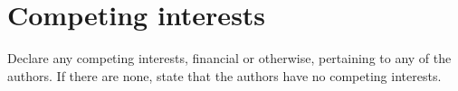 \documentclass[]{seismica}
\begin{document}
		\section*{Competing interests}
		Declare any competing interests, financial or otherwise, pertaining to any of the authors. If there are none, state that the authors have no competing interests.
		
		
		
	
\end{document}
